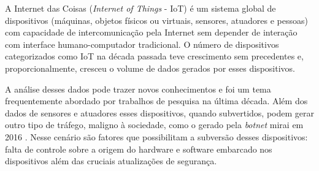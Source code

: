 

% 
% 



A Internet das Coisas (\emph{Internet of Things} - IoT) é um sistema global de
dispositivos (máquinas, objetos físicos ou virtuais, sensores, atuadores e
pessoas) com capacidade de intercomunicação pela Internet sem depender de
interação com interface humano-computador tradicional.
O número de dispositivos categorizados como IoT na década passada teve
crescimento sem precedentes e, proporcionalmente, cresceu o volume de dados
gerados por esses dispositivos.

A análise desses dados pode trazer novos conhecimentos e foi um tema frequentemente
abordado por trabalhos de pesquisa na última década.
Além dos dados de sensores e atuadores esses dispositivos, quando subvertidos,
podem gerar outro tipo de tráfego, maligno à sociedade, como o gerado pela
\emph{botnet} mirai em 2016 \cite{Kambourakis2017}.
Nesse cenário são fatores que possibilitam a subversão desses dispositivos:
falta de controle sobre a origem do hardware e software embarcado nos
dispositivos além das cruciais atualizações de segurança.

